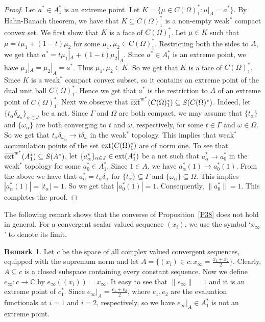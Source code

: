 \documentclass[12pt]{amsart}
\theoremstyle{definition}
\newtheorem{remark}[theorem]{Remark}
\numberwithin{equation}{section}
\begin{document}
\begin{proof}
 Let $a^*\in A_{1}^*$ is an extreme point. Let $K=\{\mu\in C(\Omega)_{1}^*:\mu|_{A}=a^*\}$. By Hahn-Banach theorem, we have that $K\subseteq C(\Omega)_{1}^*$ is a non-empty weak$^*$ compact convex set. We first show that $K$ is a face of $C(\Omega)_{1}^*$. Let $\mu\in K$ such that $\mu=t\mu_{1}+(1-t)\mu_{2}$ for some $\mu_{1}, \mu_{2}\in C(\Omega)_{1}^*$. Restricting both the sides to $A$, we get that $a^*=t{\mu_{1}}|_{A}+(1-t){\mu_{2}}|_{A}$. Since $a^*\in A_{1}^*$ is an extreme point, we have ${\mu_{1}}|_{A}={\mu_{2}}|_{A}=a^*$. Thus $\mu_{1}, \mu_{2}\in K$. So we get that $K$ is a face of $C(\Omega)_{1}^*$. Since $K$ is a weak$^*$ compact convex subset, so it contains an extreme point of the dual unit ball $C(\Omega)_{1}^*$. Hence we get that $a^*$ is the restriction to $A$ of an extreme point of $C(\Omega)_{1}^*$. Next we observe that $\overline{\textnormal{ext}}^{w^*}(C(\Omega)_{1}^*)\subseteq S(C(\Omega)^*)$. Indeed, let $\{t_{\alpha}\delta_{\omega_\alpha}\}_{\alpha\in J}$ be a net. Since $\Gamma$ and $\Omega$ are both compact, we may assume that $\{t_{\alpha}\}$ and $\{\omega_{\alpha}\}$ are both converging to $t$ and $\omega$, respectively, for some $t\in \Gamma$ and $\omega\in \Omega$. So we get that $t_{\alpha}\delta_{\omega_\alpha}\to t\delta_{\omega}$ in the weak$^*$ topology. This implies that weak$^*$ accumulation points of the set $\textnormal{ext}(C(\Omega)_{1}^{*})$ are of norm one. To see that $\overline{\textnormal{ext}}^{w^*}{(A_{1}^*)}\subseteq S(A^*)$, let $\{a^*_{\alpha}\}_{\alpha\in J}\in \textnormal{ext}(A_{1}^*)$ be a net such that $a_{\alpha}^*\to a_{0}^*$ in the weak$^*$ topology for some $a_{0}^*\in A_{1}^*$. Since $1\in A$, we have $a_{\alpha}^*(1)\to a_{0}^*(1)$. From the above we have that $a_{\alpha}^*=t_{\alpha}\delta_{\alpha}$ for $\{t_{\alpha}\}\subseteq \Gamma$ and $\{\omega_{\alpha}\}\subseteq \Omega$. This implies 
 $
 |a_{\alpha}^*(1)|=|t_{\alpha}|=1.
 $
 So we get that $|a_{0}^*(1)|=1$. Consequently, $\|a_{0}^*\|=1$. This completes the proof.
\end{proof}
The following remark shows that the converse of Proposition~\ref{P38} does not hold in general. For a convergent scalar valued sequence $(x_{i})$, we use the symbol `$x_{\infty}$' to denote its limit.
\begin{remark}
    Let $c$ be the space of all complex valued convergent sequences, equipped with the supremum norm and let $A=\{(x_{i})\in c:x_{\infty}=\frac{x_{1}+x_{2}}{2}\}$. Clearly, $A\subseteq c$ is a closed subspace containing every constant sequence. Now we define $e_{\infty}:c\to \mathbb{C}$ by $e_{\infty}((x_{i}))=x_{\infty}$. It easy to see that $\|e_{\infty}\|=1$ and it is an extreme point of $c_{1}^*$. Since $e_{\infty}|_{A}=\frac{e_{1}+e_{2}}{2}$, where $e_{1}, e_{2}$ are the evaluation functionals at $i=1$ and $i=2$, respectively, so we have $e_{\infty}|_{A}\in A_{1}^*$ is not an extreme point.
\end{remark}
\end{document}
